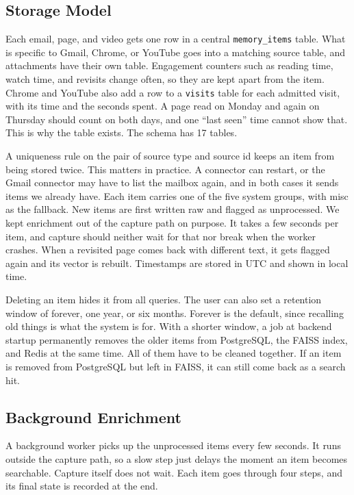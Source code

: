 \documentclass[conference]{IEEEtran}
\begin{document}
\subsection{Storage Model}
Each email, page, and video gets one row in a central \texttt{memory\_items} table. What is specific to Gmail, Chrome, or YouTube goes into a matching source table, and attachments have their own table. Engagement counters such as reading time, watch time, and revisits change often, so they are kept apart from the item. Chrome and YouTube also add a row to a \texttt{visits} table for each admitted visit, with its time and the seconds spent. A page read on Monday and again on Thursday should count on both days, and one ``last seen'' time cannot show that. This is why the table exists. The schema has 17 tables.

A uniqueness rule on the pair of source type and source id keeps an item from being stored twice. This matters in practice. A connector can restart, or the Gmail connector may have to list the mailbox again, and in both cases it sends items we already have. Each item carries one of the five system groups, with misc as the fallback. New items are first written raw and flagged as unprocessed. We kept enrichment out of the capture path on purpose. It takes a few seconds per item, and capture should neither wait for that nor break when the worker crashes. When a revisited page comes back with different text, it gets flagged again and its vector is rebuilt. Timestamps are stored in UTC and shown in local time.

Deleting an item hides it from all queries. The user can also set a retention window of forever, one year, or six months. Forever is the default, since recalling old things is what the system is for. With a shorter window, a job at backend startup permanently removes the older items from PostgreSQL, the FAISS index, and Redis at the same time. All of them have to be cleaned together. If an item is removed from PostgreSQL but left in FAISS, it can still come back as a search hit.

\subsection{Background Enrichment}
A background worker picks up the unprocessed items every few seconds. It runs outside the capture path, so a slow step just delays the moment an item becomes searchable. Capture itself does not wait. Each item goes through four steps, and its final state is recorded at the end.
\end{document}
